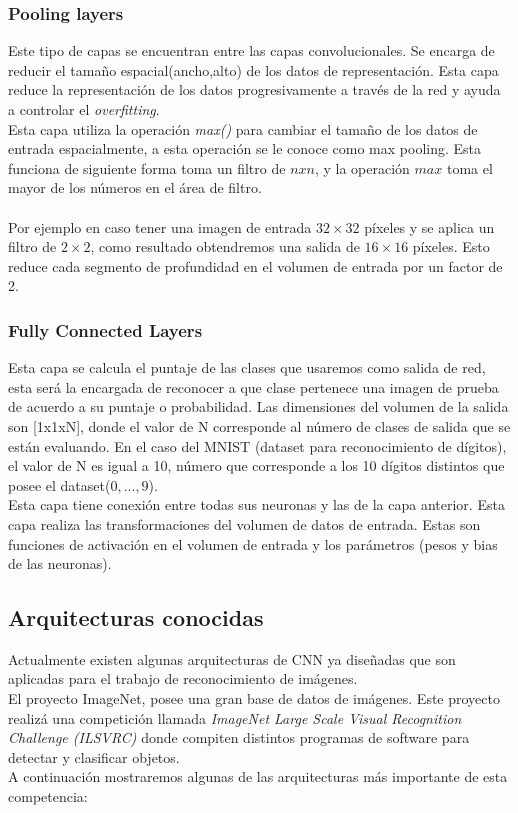 \subsubsection{Pooling layers}
Este tipo de capas se encuentran entre las capas convolucionales. Se encarga de reducir el tamaño espacial(ancho,alto) de los datos de representación. Esta capa reduce la representación de los datos progresivamente a través de la red y ayuda a controlar el \textit{overfitting}.\\
Esta capa utiliza la operación \textit{max()} para cambiar el tamaño de los datos de entrada espacialmente, a esta operación se le conoce como max pooling. Esta funciona de siguiente forma toma un filtro de $n x n$, y la operación $max$ toma el mayor de los números en el área de filtro.\\ \\ Por ejemplo en caso tener una imagen de entrada $32 \times 32$ píxeles y se aplica un filtro de $2\times2$, como resultado obtendremos una salida de $16\times16$ píxeles. Esto reduce cada segmento de profundidad en el volumen de entrada por un factor de 2.

\subsubsection{Fully Connected Layers}

Esta capa se calcula el puntaje de las clases que usaremos como salida de red, esta será la encargada de reconocer a que clase pertenece una imagen de prueba de acuerdo a su puntaje o probabilidad. Las dimensiones del volumen de la salida son [1x1xN], donde el valor de N corresponde al número de clases de salida que se están evaluando. En el caso del MNIST (dataset para reconocimiento de dígitos), el valor de N es igual a 10, número que corresponde a los 10 dígitos distintos que posee el dataset($0, ... ,9$).\\
Esta capa tiene conexión entre todas sus neuronas y las de la capa anterior. Esta capa realiza las transformaciones del volumen de datos de entrada. Estas son funciones de activación en el volumen de entrada y los parámetros (pesos y bias de las neuronas).
\vspace{2cm}
\subsection{Arquitecturas conocidas}
Actualmente existen algunas arquitecturas de CNN ya diseñadas que son aplicadas para el trabajo de reconocimiento de imágenes.\\ El proyecto ImageNet, posee una gran base de datos de imágenes. Este proyecto realizá una competición llamada \textit{ImageNet Large Scale Visual Recognition Challenge (ILSVRC) } donde compiten distintos programas de software para detectar y clasificar objetos.\\ A continuación mostraremos algunas de las arquitecturas más importante de esta competencia:

